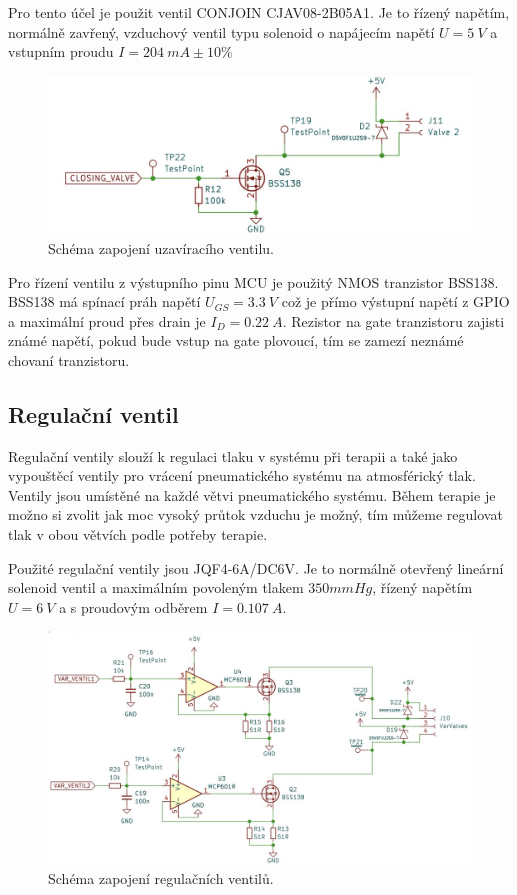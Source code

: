 Pro tento účel je použit ventil CONJOIN CJAV08-2B05A1. Je to řízený napětím, normálně zavřený, vzduchový ventil typu solenoid o napájecím napětí $U = 5 \ V$ a vstupním proudu $I = 204 \ mA \pm 10\% $

\begin{figure}[H]
    \includegraphics[width=0.9\linewidth]{pictures/closing_valve_driver.jpg}
    \caption{Schéma zapojení uzavíracího ventilu.}
    \label{fig:closing_valve_driver}
\end{figure}

Pro řízení ventilu z výstupního pinu MCU je použitý NMOS tranzistor BSS138. BSS138 má spínací práh napětí $U_{GS} = 3.3 \ V$ což je přímo výstupní napětí z GPIO a maximální proud přes drain je $I_D = 0.22 \ A$.
Rezistor na gate tranzistoru zajisti známé napětí, pokud bude vstup na gate plovoucí, tím se zamezí neznámé chovaní tranzistoru.

\subsection{Regulační ventil}
Regulační ventily slouží k regulaci tlaku v systému při terapii a také jako vypouštěcí ventily pro vrácení pneumatického systému na atmosférický tlak. Ventily jsou umístěné na každé větvi pneumatického systému. Během terapie je možno si zvolit jak moc vysoký průtok vzduchu je možný, tím můžeme regulovat tlak v obou větvích podle potřeby terapie. \par

Použité regulační ventily jsou JQF4-6A/DC6V. Je to normálně otevřený lineární solenoid ventil a maximálním povoleným tlakem $350mmHg$, řízený napětím $U = 6 \ V$ a s proudovým odběrem $I = 0.107 \ A$.\par

\begin{figure}[H]
    \includegraphics[width=1\linewidth]{pictures/var_valves.jpg}
    \caption{Schéma zapojení regulačních ventilů.}
    \label{fig:variable_valve_driver}
\end{figure}

